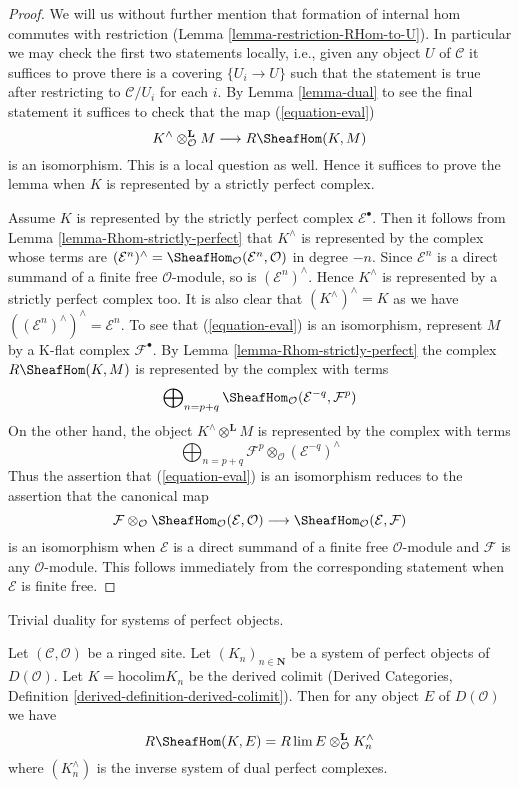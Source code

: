 \begin{proof}
We will us without further mention that formation of internal hom commutes
with restriction (Lemma \ref{lemma-restriction-RHom-to-U}).
In particular we may check the first two statements locally, i.e., given
any object $U$ of $\mathcal{C}$ it suffices to prove there is a covering
$\{U_i \to U\}$ such that the statement is true after restricting to
$\mathcal{C}/U_i$ for each $i$.
By Lemma \ref{lemma-dual} to see the final statement it suffices to check
that the map (\ref{equation-eval})
$$
K^\wedge \otimes^\mathbf{L}_\mathcal{O} M
\longrightarrow
R\SheafHom(K, M)
$$
is an isomorphism. This is a local question as well.
Hence it suffices to prove the lemma when $K$ is represented
by a strictly perfect complex.

\medskip\noindent
Assume $K$ is represented by the strictly perfect complex
$\mathcal{E}^\bullet$. Then it follows from
Lemma \ref{lemma-Rhom-strictly-perfect}
that $K^\wedge$ is represented by the complex whose terms are
$(\mathcal{E}^n)^\wedge =
\SheafHom_\mathcal{O}(\mathcal{E}^n, \mathcal{O})$
in degree $-n$. Since $\mathcal{E}^n$ is a direct summand of a finite
free $\mathcal{O}$-module, so is $(\mathcal{E}^n)^\wedge$.
Hence $K^\wedge$ is represented by a strictly perfect complex too.
It is also clear that $(K^\wedge)^\wedge = K$ as we have
$((\mathcal{E}^n)^\wedge)^\wedge = \mathcal{E}^n$.
To see that (\ref{equation-eval}) is an isomorphism, represent
$M$ by a K-flat complex $\mathcal{F}^\bullet$.
By Lemma \ref{lemma-Rhom-strictly-perfect} the complex
$R\SheafHom(K, M)$ is represented by the complex with terms
$$
\bigoplus\nolimits_{n = p + q}
\SheafHom_\mathcal{O}(\mathcal{E}^{-q}, \mathcal{F}^p)
$$
On the other hand, the object $K^\wedge \otimes^\mathbf{L} M$
is represented by the complex with terms
$$
\bigoplus\nolimits_{n = p + q}
\mathcal{F}^p \otimes_\mathcal{O} (\mathcal{E}^{-q})^\wedge
$$
Thus the assertion that (\ref{equation-eval}) is an isomorphism
reduces to the assertion that the canonical map
$$
\mathcal{F}
\otimes_\mathcal{O}
\SheafHom_\mathcal{O}(\mathcal{E}, \mathcal{O})
\longrightarrow
\SheafHom_\mathcal{O}(\mathcal{E}, \mathcal{F})
$$
is an isomorphism when $\mathcal{E}$ is a direct summand of a finite
free $\mathcal{O}$-module and $\mathcal{F}$ is any $\mathcal{O}$-module.
This follows immediately from the corresponding statement when
$\mathcal{E}$ is finite free.
\end{proof}

\begin{lemma}
\label{lemma-colim-and-lim-of-duals}
\begin{slogan}
Trivial duality for systems of perfect objects.
\end{slogan}
Let $(\mathcal{C}, \mathcal{O})$ be a ringed site. Let
$(K_n)_{n \in \mathbf{N}}$ be a system of perfect objects of $D(\mathcal{O})$.
Let $K = \text{hocolim} K_n$ be the derived colimit
(Derived Categories, Definition \ref{derived-definition-derived-colimit}).
Then for any object $E$ of $D(\mathcal{O})$ we have
$$
R\SheafHom(K, E) = R\lim E \otimes^\mathbf{L}_\mathcal{O} K_n^\wedge
$$
where $(K_n^\wedge)$ is the inverse system of dual perfect complexes.
\end{lemma}


